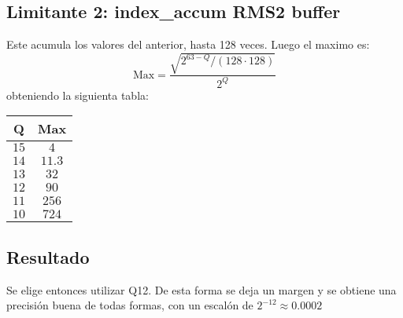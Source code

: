 \documentclass[../main.tex]{subfiles}
\begin{document}
\subsection{Limitante 2: index\_accum RMS2 buffer}
Este acumula los valores del anterior, hasta 128 veces. Luego el maximo es:
\[
    \text{Max} = \frac{\sqrt{2^{63 - Q} / (128 \cdot 128)}}{2^Q}
\]
obteniendo la siguienta tabla:

\begin{table}[!hbtp]
    \centering
    \begin{tabular}{@{}cc@{}}
    \toprule
    Q  & Max  \\ \midrule
    $15$ & $4$ \\
    $14$ & $11.3$   \\
    $13$ & $32$   \\
    $12$ & $90$  \\
    $11$ & $256$  \\
    $10$ & $724$  \\ \bottomrule
    \end{tabular}
\end{table}

\subsection{Resultado}
Se elige entonces utilizar Q12. De esta forma se deja un margen y se obtiene una precisión buena de todas formas, con un escalón de $2^{-12} \approx 0.0002$

\end{document}
